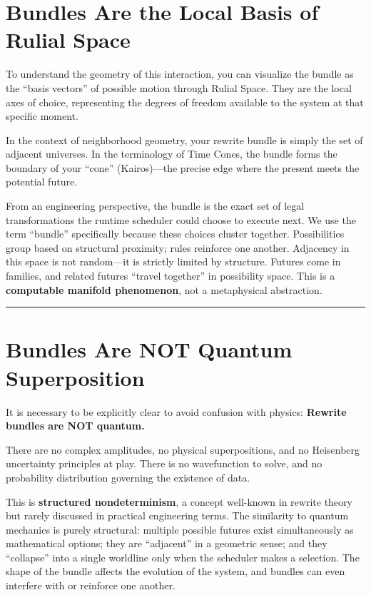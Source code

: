 \section{\texorpdfstring{\textbf{Bundles Are the Local Basis of Rulial Space}}{11.2 --- Bundles Are the Local Basis of Rulial Space}}

To understand the geometry of this interaction, you can visualize the bundle as the ``basis vectors'' of possible motion through Rulial Space. They are the local axes of choice, representing the degrees of freedom available to the system at that specific moment.

In the context of neighborhood geometry, your rewrite bundle is simply the set of adjacent universes. In the terminology of Time Cones, the bundle forms the boundary of your ``cone'' (Kairos)—the precise edge where the present meets the potential future.

From an engineering perspective, the bundle is the exact set of legal transformations the runtime scheduler could choose to execute next. We use the term ``bundle'' specifically because these choices cluster together. Possibilities group based on structural proximity; rules reinforce one another. Adjacency in this space is not random—it is strictly limited by structure. Futures come in families, and related futures ``travel together'' in possibility space. This is a \textbf{computable manifold phenomenon}, not a metaphysical abstraction.

\begin{center}\rule{0.5\linewidth}{0.5pt}\end{center}

\section{\texorpdfstring{\textbf{Bundles Are NOT Quantum Superposition}}{11.3 --- Bundles Are NOT Quantum Superposition}}

It is necessary to be explicitly clear to avoid confusion with physics: \textbf{Rewrite bundles are NOT quantum.}

There are no complex amplitudes, no physical superpositions, and no Heisenberg uncertainty principles at play. There is no wavefunction to solve, and no probability distribution governing the existence of data.

This is \textbf{structured nondeterminism}, a concept well-known in rewrite theory but rarely discussed in practical engineering terms. The similarity to quantum mechanics is purely structural: multiple possible futures exist simultaneously as mathematical options; they are ``adjacent'' in a geometric sense; and they ``collapse'' into a single worldline only when the scheduler makes a selection. The shape of the bundle affects the evolution of the system, and bundles can even interfere with or reinforce one another.

